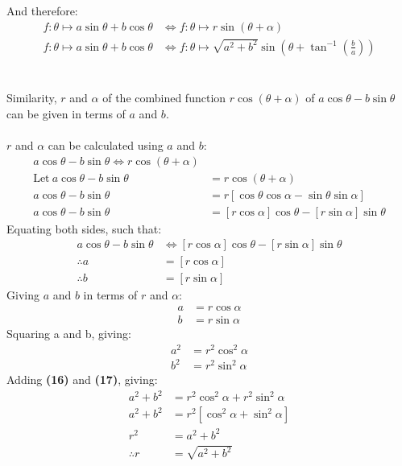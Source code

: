 \documentclass{article}
\begin{document}
        And therefore:
        \begin{align*}
            f:\theta \mapsto a\sin\theta + b\cos\theta &\Leftrightarrow f:\theta \mapsto r\sin{\left( \theta + \alpha \right) } \\
            f:\theta \mapsto a\sin\theta + b\cos\theta &\Leftrightarrow f:\theta \mapsto \sqrt{a^2 + b^2}\sin{\left( \theta + \tan^{-1}{\left( \frac{b}{a}\right) }\right) }
        \end{align*}
        \\\\
        Similarity, $r$ and $\alpha$ of the combined function $r\cos{(\theta + \alpha)}$ of $a\cos{\theta} - b\sin{\theta}$ can be given in terms of $a$ and $b$.
        \\\\
        $r$ and $\alpha$ can be calculated using $a$ and $b$:
        \begin{align*}
        a\cos{\theta} - b\sin{\theta} \Leftrightarrow r\cos{(\theta + \alpha)} \\
        \mathrm{Let \ } a\cos{\theta} - b\sin{\theta} &= r\cos{(\theta + \alpha)} \\
        a\cos{\theta} - b\sin{\theta} &= r[\cos\theta\cos\alpha - \sin\theta\sin\alpha] \\
        a\cos{\theta} - b\sin{\theta} &= [r\cos\alpha]\cos{\theta} - [r\sin\alpha]\sin{\theta}
        \end{align*}
        Equating both sides, such that:
        \begin{align*}
        a\cos{\theta} - b\sin{\theta} &\Leftrightarrow [r\cos\alpha]\cos{\theta} - [r\sin\alpha]\sin{\theta} \\
        \therefore a &= [r\cos\alpha] \\
        \therefore b &= [r\sin\alpha]
        \end{align*}
        Giving $a$ and $b$ in terms of $r$ and $\alpha$:
        \begin{align}
        a &= r\cos\alpha \\
        b &= r\sin\alpha
        \end{align}
        Squaring a and b, giving:
        \begin{align}
        a^2 &= r^2\cos^2{\alpha} \\
        b^2 &= r^2\sin^2{\alpha}
        \end{align}
        Adding \textbf{(16)} and \textbf{(17)}, giving:
        \begin{align*}
        a^2 + b^2 &= r^2\cos^2{\alpha} + r^2\sin^2{\alpha} \\
        a^2 + b^2 &= r^2[\cos^2{\alpha} + \sin^2{\alpha}] \\
        r^2 &= a^2 + b^2 \\
        \therefore r &= \sqrt{a^2 + b^2}
        \end{align*}
\end{document}
